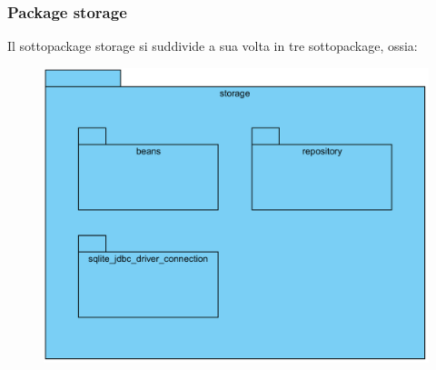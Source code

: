 \documentclass[11pt]{article}
\begin{document}
			\subsubsection{Package storage}
			Il sottopackage storage si suddivide a sua volta in tre sottopackage, ossia: 
			 \begin{figure}[!h]
				\centering
				\includegraphics{diagrams/StoragePackageDiagram}
			\end{figure}
\end{document}
